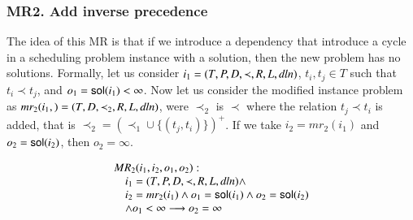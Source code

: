 \subsubsection{MR2. Add inverse precedence}
The idea of this MR is that if we introduce a dependency that
introduce a cycle in a scheduling problem instance with a solution,
then the new problem has no solutions. Formally,
let us consider $i_{1}=(T, P, D, \prec, R, L, \mathit{dln})$,
$t_{i}, t_{j}\in T$ such that $t_{i}\prec t_{j}$, and
$o_{1}=\mathsf{sol}(i_{1})<\infty$.
Now let us consider
the modified instance problem as $mr_{2}(i_{1},)=(T, D, \prec_{2}, R, L,
\mathit{dln})$,
were $\prec_{2}$ is $\prec$ where the relation $t_{j}\prec t_{i}$ is
added, that is $\prec_{2}= (\prec_{1}\cup \{(t_{j}, t_{i})\})^{+}$.
If we take $i_{2}=mr_{2}(i_{1})$ and $o_{2}=\mathsf{sol}(i_{2})$, then
$o_{2}=\infty$.

\begin{framed}
  \begin{displaymath}
      \begin{array}{l}
    MR_{2}(i_1,i_2,o_{1},o_{2}):\\
      \hskip 1em i_1=(T,P,D,\prec,R,L,\mathit{dln})\wedge  \\
      \hskip 1em  i_2=mr_2(i_1)\wedge o_{1}=\mathsf{sol}(i_{1})\wedge o_{2}=\mathsf{sol}(i_2)\\
      \hskip 1em \wedge o_{1}<\infty
      \longrightarrow o_2=\infty
    \end{array}
  \end{displaymath}
\end{framed}








